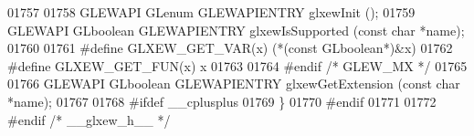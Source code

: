 \begin{DoxyCode}
01757 
01758 GLEWAPI GLenum GLEWAPIENTRY glxewInit ();
01759 GLEWAPI GLboolean GLEWAPIENTRY glxewIsSupported (\textcolor{keyword}{const} \textcolor{keywordtype}{char} *name);
01760 
01761 \textcolor{preprocessor}{#define GLXEW\_GET\_VAR(x) (*(const GLboolean*)&x)}
01762 \textcolor{preprocessor}{#define GLXEW\_GET\_FUN(x) x}
01763 
01764 \textcolor{preprocessor}{#endif }\textcolor{comment}{/* GLEW\_MX */}\textcolor{preprocessor}{}
01765 
01766 GLEWAPI GLboolean GLEWAPIENTRY glxewGetExtension (\textcolor{keyword}{const} \textcolor{keywordtype}{char} *name);
01767 
01768 \textcolor{preprocessor}{#ifdef \_\_cplusplus}
01769 \}
01770 \textcolor{preprocessor}{#endif}
01771 
01772 \textcolor{preprocessor}{#endif }\textcolor{comment}{/* \_\_glxew\_h\_\_ */}\textcolor{preprocessor}{}
\end{DoxyCode}
